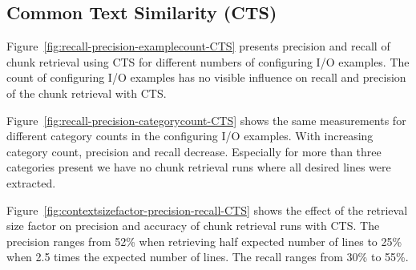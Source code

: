 \documentclass[\myrootdir/main.tex]{subfiles}
\begin{document}
\subsection{Common Text Similarity (CTS)}
Figure~\ref{fig:recall-precision-examplecount-CTS} presents precision and recall of chunk retrieval using CTS for different numbers of configuring I/O examples.
The count of configuring I/O examples has no visible influence on recall and precision of the chunk retrieval with CTS\@.

Figure~\ref{fig:recall-precision-categorycount-CTS} shows the same measurements for different category counts in the configuring I/O examples.
With increasing category count, precision and recall decrease.
Especially for more than three categories present we have no chunk retrieval runs where all desired lines were extracted.

Figure~\ref{fig:contextsizefactor-precision-recall-CTS} shows the effect of the retrieval size factor on precision and accuracy of chunk retrieval runs with CTS\@.
The precision ranges from 52\% when retrieving half expected number of lines to 25\% when 2.5 times the expected number of lines.
The recall ranges from 30\% to 55\%.
\end{document}
